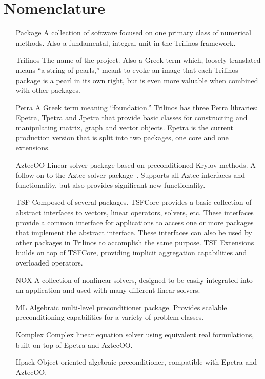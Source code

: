 \documentclass[12pt,relax]{TrilinosDevGuide}
\begin{document}
\section*{Nomenclature}
\begin{itemize}
\item[Package]
A collection of software focused on one primary class of numerical
methods.  Also a fundamental, integral unit in the Trilinos framework.
\item[Trilinos]
The name of the project.  Also a Greek term which,
loosely translated means ``a string of pearls,'' 
meant to evoke an image that each Trilinos package is a pearl in its 
own right, but is even more valuable when combined with other 
packages.
\item[Petra]
A Greek term meaning ``foundation.''  Trilinos has three Petra 
libraries: Epetra, Tpetra and Jpetra that provide basic classes 
for constructing and manipulating matrix, graph and vector
objects.  Epetra is the current production version that is
split into two packages, one core and one extensions.
\item[AztecOO] 
Linear solver package based on preconditioned Krylov methods.  A 
follow-on to the Aztec solver package~\cite{Aztec2.1}.  
Supports all Aztec 
interfaces and functionality, but also provides significant new 
functionality.
\item[TSF]
Composed of several packages.  TSFCore provides 
a basic collection of abstract interfaces to vectors, linear
operators, solvers, etc.  These interfaces provide a common
interface for applications to access one or more packages that
implement the abstract interface.  These interfaces can also be used
by other packages in Trilinos to accomplish the same purpose.
TSF Extensions builds on top of TSFCore, providing implicit
aggregation capabilities and overloaded operators.
\item[NOX]
A collection of nonlinear solvers, designed to be easily integrated
into an application and used with many different linear solvers.
\item[ML]
Algebraic multi-level preconditioner package.  Provides scalable
preconditioning capabilities for a variety of problem classes.
\item[Komplex] 
Complex linear equation solver using equivalent real formulations,
built on top of Epetra and AztecOO.
\item[Ifpack] 
Object-oriented algebraic preconditioner, compatible with 
Epetra and AztecOO.
\end{itemize}
\end{document}
